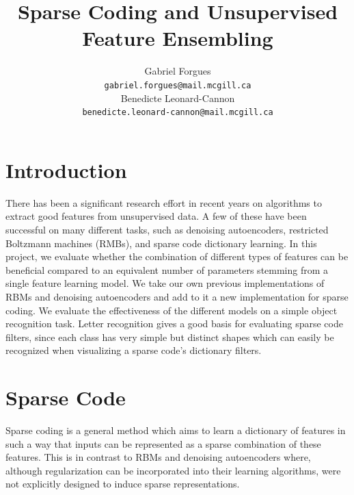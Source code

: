 \documentclass{article} %
\title{Sparse Coding and Unsupervised Feature Ensembling}
\author{
Gabriel Forgues \\
\texttt{gabriel.forgues@mail.mcgill.ca} \\
\And 
Benedicte Leonard-Cannon \\
\texttt{benedicte.leonard-cannon@mail.mcgill.ca} \\
}
\begin{document}
\maketitle

\section{Introduction}
There has been a significant research effort in recent years on algorithms to extract good features from unsupervised data. A few of these have been successful on many different tasks, such as denoising autoencoders, restricted Boltzmann machines (RMBs), and sparse code dictionary learning. In this project, we evaluate whether the combination of different types of features can be beneficial compared to an equivalent number of parameters stemming from a single feature learning model. We take our own previous implementations of RBMs and denoising autoencoders and add to it a new implementation for sparse coding. We evaluate the effectiveness of the different models on a simple object recognition task. Letter recognition gives a good basis for evaluating sparse code filters, since each class has very simple but distinct shapes which can easily be recognized when visualizing a sparse code's dictionary filters.

\section{Sparse Code}
Sparse coding is a general method which aims to learn a dictionary of features in such a way that inputs can be represented as a sparse combination of these features. This is in contrast to RBMs and denoising autoencoders where, although regularization can be incorporated into their learning algorithms, were not explicitly designed to induce sparse representations.
\end{document}
